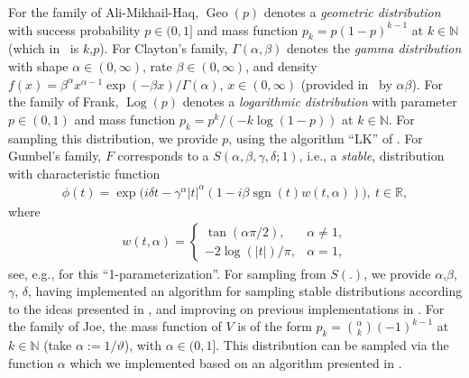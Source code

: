 \documentclass[nojss,article]{jss}
\theoremstyle{mythmstyle}
\newcommand*{\R}{\proglang{R}}%
\newcommand*{\IN}{\mathbb{N}}
\newcommand*{\IR}{\mathbb{R}}
\newcommand*{\sgn}{\operatorname*{sgn}}
\newcommand*{\vt}{\vartheta}
\newcommand*{\Geo}{\operatorname*{Geo}}
\newcommand*{\Log}{\operatorname*{Log}}
\newcommand*{\textcite}[2][]{\citet[#1]{#2}}
\begin{document}
For the family of Ali-Mikhail-Haq, $\Geo(p)$ denotes a \textit{geometric
  distribution} with success probability $p\in(0,1]$ and mass function
$p_k=p(1-p)^{k-1}$ at $k\in\IN$ (which in \R\ is $k$,$p$\code{)}).
%
For Clayton's family, $\Gamma(\alpha,\beta)$ denotes the \textit{gamma
  distribution} with shape $\alpha\in(0,\infty)$, rate
$\beta\in(0,\infty)$, and density
$f(x)=\beta^\alpha x^{\alpha-1}\exp(-\beta x)/\Gamma(\alpha)$, $x\in(0,\infty)$
(provided in \R\ by $\alpha$$\beta$\code{)}).
%
For the family of Frank, $\Log(p)$ denotes a
\textit{logarithmic distribution} with parameter $p\in(0,1)$ and mass
function $p_k=p^k/(-k\log(1-p))$ at $k\in\IN$. For sampling this
distribution, we provide $p$\code{)}, using the algorithm
``LK'' of \textcite{kemp1981}.
%
For Gumbel's family, $F$ corresponds to a $S(\alpha, \beta, \gamma, \delta; 1)$, i.e., a \textit{stable}, distribution with characteristic function
\begin{align}
	\phi(t)=\exp\bigl(i\delta t-\gamma^\alpha\lvert t\rvert^\alpha(1-i\beta\sgn(t)w(t,\alpha))\bigr),\ t\in\IR,
\end{align}
where
\begin{align*}
	w(t,\alpha)=\begin{cases}
			\tan(\alpha\pi/2),&\alpha\neq1,\\
			-2\log(\lvert t\rvert)/\pi,&\alpha=1,
		\end{cases}
\end{align*}
see, e.g., \textcite[p.\ 8]{nolan2009} for this ``1-parameterization''. For
sampling from $S(.)$, we provide
$\alpha$,$\beta$,$\gamma$, $\delta$,
having implemented an algorithm for sampling stable distributions according
to the ideas presented in \textcite{chambersmallowsstuck1976}, and
improving on previous implementations in \R.
%
For the family of Joe, the mass function of $V$ is of the form
$p_k=\binom{\alpha}{k}(-1)^{k-1}$ at $k\in\IN$ (take $\alpha:=1/\vt$), with
$\alpha\in(0,1]$. This distribution can be sampled via the \R{} function
$\alpha$\code{)} which we implemented based on an algorithm
presented in \textcite{hofert2010a}.
\end{document}
